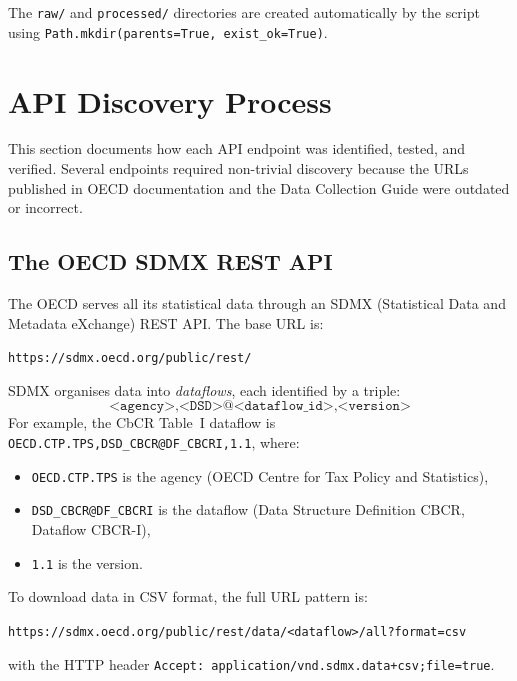 \documentclass[12pt,a4paper]{article}
\begin{document}
The \texttt{raw/} and \texttt{processed/} directories are created automatically by the script using \texttt{Path.mkdir(parents=True, exist\_ok=True)}.


\section{API Discovery Process}\label{sec:api_discovery}

This section documents how each API endpoint was identified, tested, and verified.
Several endpoints required non-trivial discovery because the URLs published in OECD documentation and the Data Collection Guide were outdated or incorrect.

\subsection{The OECD SDMX REST API}\label{sec:oecd_sdmx}

The OECD serves all its statistical data through an SDMX (Statistical Data and Metadata eXchange) REST API.
The base URL is:

\begin{apibox}
\texttt{https://sdmx.oecd.org/public/rest/}
\end{apibox}

\noindent
SDMX organises data into \emph{dataflows}, each identified by a triple:
\[
\texttt{<agency>,<DSD>@<dataflow\_id>,<version>}
\]
For example, the CbCR Table~I dataflow is \texttt{OECD.CTP.TPS,DSD\_CBCR@DF\_CBCRI,1.1}, where:
\begin{itemize}
    \item \texttt{OECD.CTP.TPS} is the agency (OECD Centre for Tax Policy and Statistics),
    \item \texttt{DSD\_CBCR@DF\_CBCRI} is the dataflow (Data Structure Definition CBCR, Dataflow CBCR-I),
    \item \texttt{1.1} is the version.
\end{itemize}

To download data in CSV format, the full URL pattern is:
\begin{center}
\small\texttt{https://sdmx.oecd.org/public/rest/data/<dataflow>/all?format=csv}
\end{center}
with the HTTP header \texttt{Accept: application/vnd.sdmx.data+csv;file=true}.
\end{document}
